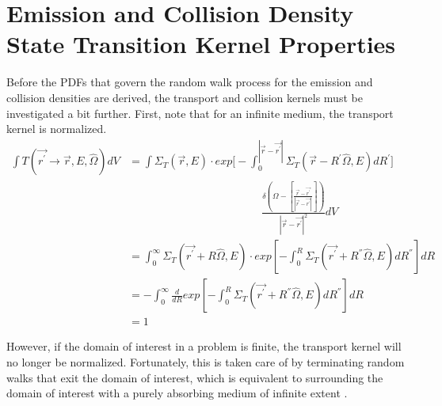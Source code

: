 \section{Emission and Collision Density State Transition Kernel Properties}
Before the PDFs that govern the random walk process for the emission and
collision densities are derived, the transport and collision kernels must be 
investigated a bit further. First, note that for an infinite medium, the 
transport kernel is normalized. 
\begin{align}
  \int T(\vec{r^{'}} \to \vec{r},E,\hat{\Omega})dV & =
    \int \Sigma_T(\vec{r},E)
    \cdot exp\Big[-\int_0^{|\vec{r} - \vec{r^{'}}|} 
      \Sigma_T(\vec{r}-R^{'}\hat{\Omega},E)dR^{'} \Big] \nonumber \\
    & \qquad \qquad \qquad \qquad \qquad \qquad
    \frac{\delta \left(\Omega - \left[\frac{\vec{r} - \vec{r^{'}}}
        {|\vec{r} - \vec{r^{'}}|}\right]\right)}
    {|\vec{r} - \vec{r^{'}}|^2} dV \nonumber \\
  & = \int_0^{\infty} \Sigma_T(\vec{r^{'}}+R\hat{\Omega},E)
  \cdot exp\left[-\int_0^R \Sigma_T(\vec{r^{'}}+R^{''}\hat{\Omega},E)
    dR^{''} \right] dR \nonumber \\
  & = -\int_0^{\infty} \frac{d}{dR} exp\left[-\int_0^R 
    \Sigma_T(\vec{r^{'}}+R^{''}\hat{\Omega},E) dR^{''} \right] dR 
  \nonumber \\
  & = 1 \nonumber
\end{align}
  
However, if the domain of interest in a problem is finite, the transport kernel 
will no longer be normalized. Fortunately, this is taken care of by terminating 
random walks that exit the domain of interest, which is equivalent to 
surrounding the domain of interest with a purely absorbing medium of infinite 
extent \citep{irving_adjoint_1971}.


